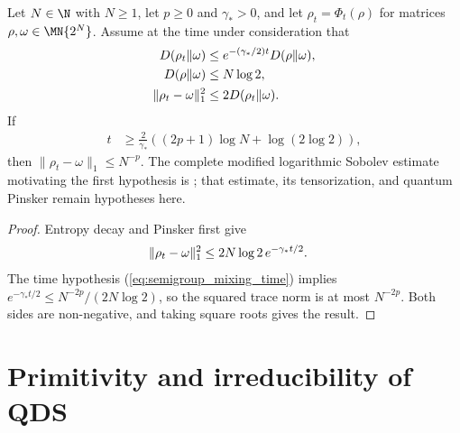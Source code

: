\begin{theorem}
    \label{thm:two_pauli_conditional_trace_norm_mixing}
    \leanok
    Let $N\in\N$ with $N\ge1$, let $p\ge0$ and $\gamma_*>0$, and let
    $\rho_t=\Phi_t(\rho)$ for matrices $\rho,\omega\in\MN{2^N}$.
    Assume at the time under consideration that
    \begin{align}
        D(\rho_t\Vert\omega)
            &\le e^{-(\gamma_*/2)t}D(\rho\Vert\omega),
            \notag\\
        D(\rho\Vert\omega)&\le N\log 2,
            \notag\\
        \lVert\rho_t-\omega\rVert_1^2
            &\le 2D(\rho_t\Vert\omega).
            \notag
    \end{align}
    If
    \begin{align}
        t&\ge \frac{2}{\gamma_*}
        ((2p+1)\log N+\log(2\log2)),
        \label{eq:semigroup_mixing_time}
    \end{align}
    then $\lVert\rho_t-\omega\rVert_1\le N^{-p}$.
    The complete modified logarithmic Sobolev estimate motivating the first
    hypothesis is \cite[Theorems~1.1 and~3.3]{GaoRouze2022Complete}; that
    estimate, its tensorization, and quantum Pinsker remain hypotheses here.
\end{theorem}

\begin{proof}
    \leanok
    Entropy decay and Pinsker first give
    \begin{align}
        \lVert\rho_t-\omega\rVert_1^2
        &\le 2N\log2\,e^{-\gamma_*t/2}.
        \notag
    \end{align}
    The time hypothesis (\ref{eq:semigroup_mixing_time}) implies
    $e^{-\gamma_*t/2}\le N^{-2p}/(2N\log2)$, so the squared trace norm is at
    most $N^{-2p}$. Both sides are non-negative, and taking square roots gives
    the result.
\end{proof}

\section{Primitivity and irreducibility of QDS}
\label{sec:qds_primitivity}

